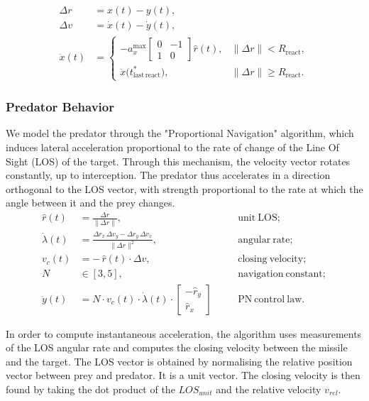 \documentclass[11pt, twocolumn]{article}
\begin{document}
    \[
      \begin{aligned}
        \Delta r &= x(t) - y(t), \\
        \Delta v &= \dot{x}(t) - \dot{y}(t), \\
        \ddot{x}(t) &=
        \begin{cases}
          - a_x^{\max}
          \begin{bmatrix}
            0 & -1 \\
            1 & 0
          \end{bmatrix}
          \hat{r}(t), & \|\Delta r\| < R_{\mathrm{react}}, \\[1.2em]
          \ddot{x}\bigl(t^*_{\mathrm{last\,react}}\bigr), & \|\Delta r\| \ge R_{\mathrm{react}}.
        \end{cases}
      \end{aligned}
    \]
    \subsubsection{Predator Behavior}
    We model the predator through the "Proportional Navigation" algorithm, which induces lateral acceleration proportional to the rate of change of the Line Of Sight (LOS) of the target. Through this mechanism, the velocity vector rotates constantly, up to interception. The predator thus accelerates in a direction orthogonal to the LOS vector, with strength proportional to the rate at which the angle between it and the prey changes.
    \[
      \begin{aligned}
        \hat r(t) &= \frac{\Delta r}{\|\Delta r\|},
        &\quad &\mathrm{unit\ LOS};\\
        \dot\lambda(t) &= \frac{\Delta r_x\,\Delta v_y - \Delta r_y\,\Delta v_x}{\|\Delta r\|^2},
        &\quad &\mathrm{angular\ rate};\\
        v_c(t) &= -\,\hat r(t)\cdot\Delta v,
        &\quad &\mathrm{closing\ velocity};\\
        N &\in [3,5],
        &\quad &\mathrm{navigation\ constant};\\
        \ddot{y}(t) &= N \cdot v_c(t) \cdot \dot{\lambda}(t) \cdot
        \begin{bmatrix} -\hat{r}_y \\ \hat{r}_x
        \end{bmatrix}
        &\quad &\mathrm{PN\ control\ law}.
      \end{aligned}
    \]

    In order to compute instantaneous acceleration, the algorithm uses measurements of the LOS angular rate and computes the closing velocity between the missile and the target. The LOS vector is obtained by normalising the relative position vector between prey and predator. It is a unit vector. The closing velocity is then found by taking the dot product of the $\textit{LOS}_{unit}$ and the relative velocity $\textit{v}_{rel}$.
\end{document}
